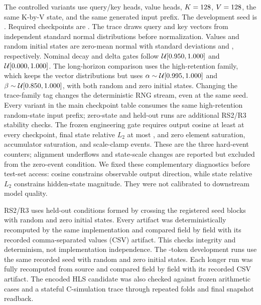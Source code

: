 \documentclass[conference]{IEEEtran}
\begin{document}
The controlled variants use \CorrectedNumQkHeads{} query/key heads,
\CorrectedNumValueHeads{} value heads, $K=128$,
$V=128$, the
same K-by-V state, and the same generated input prefix. The development seed is
\texttt{\CorrectedSeedHex}. Required checkpoints are \CorrectedCheckpointSet.
The trace draws query and key vectors from independent standard normal
distributions before normalization. Values and random initial states are
zero-mean normal with standard deviations \CorrectedSyntheticValueStdDev{} and
\CorrectedSyntheticInitialStateStdDev{}, respectively. Nominal decay and delta
gates follow $\mathcal{U}[0.950,
1.000]$ and
$\mathcal{U}[0.000,1.000]$.
The long-horizon comparison uses the high-retention family, which keeps the
vector distributions but uses
$\alpha\sim\mathcal{U}[0.995,
1.000]$ and
$\beta\sim\mathcal{U}[0.850,
1.000]$, with both random and zero initial states.
Changing the trace-family tag changes the deterministic RNG stream, even at the
same seed. Every variant in the main checkpoint table consumes the same
high-retention random-state input prefix; zero-state and held-out runs are
additional RS2/R3 stability checks.
The frozen engineering gate requires output cosine at least
\CorrectedOutputCosineThreshold{} at every checkpoint, final state relative
$L_2$ at most \CorrectedFinalStateRelLTwoThreshold{}, and zero element
saturation, accumulator saturation, and scale-clamp events. These are the three
hard-event counters; alignment underflows and state-scale changes are reported
but excluded from the zero-event condition. We fixed these
complementary diagnostics before test-set access: cosine constrains observable
output direction, while state relative $L_2$ constrains hidden-state magnitude.
They were not calibrated to downstream model quality.

RS2/R3 uses \RsTwoHeldoutRuns{} held-out conditions formed by crossing the
registered seed blocks with random and zero initial states. Every artifact was
deterministically recomputed by the same implementation and compared field by
field with its recorded comma-separated values (CSV) artifact. This checks
integrity and determinism, not implementation independence. The
\RsTwoExtendedRuns{} \RsTwoLongTokens{}-token development runs use the same
recorded seed with random and zero initial states. Each longer run was fully
recomputed from source and compared field by field with its recorded CSV
artifact. The encoded HLS candidate was
also checked against frozen arithmetic cases and a stateful C-simulation trace
through repeated folds and final snapshot readback.
\end{document}
